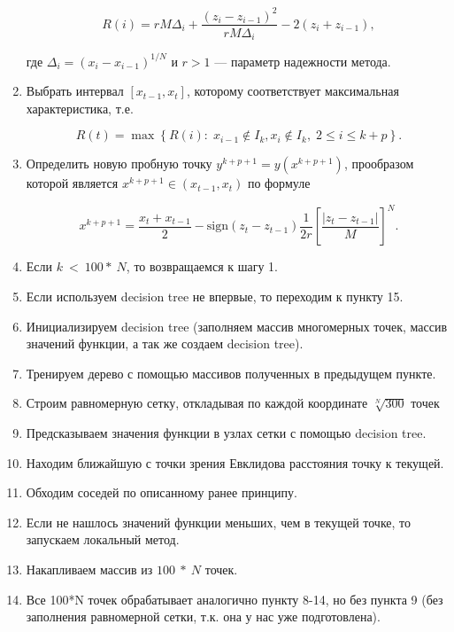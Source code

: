 \documentclass{svproc}
\begin{document}
\begin{enumerate}
\begin{displaymath}
R\left(i\right)=rM\Delta_i+\frac{\left(z_i-z_{i-1}\right)^2}{rM\Delta_i}-2\left(z_i+z_{i-1}\right),
\end{displaymath}

где $\Delta_i=\left(x_i-x_{i-1}\right)^{1/N}$ и $ r>1$ — параметр надежности метода.

\item  Выбрать интервал $\left[x_{t-1},x_t\right]$, которому соответствует максимальная характеристика, т.е.

\begin{displaymath}
R\left(t\right)=\max{\left\{R\left(i\right):\;x_{i-1}\notin I_k,x_i\notin I_k,\;2\le i\le k+p\right\}}.
\end{displaymath}

\item  Определить новую пробную точку $y^{k+p+1}=y\left(x^{k+p+1}\right)$, прообразом которой является $x^{k+p+1}\in\left(x_{t-1},x_t\right)$ по формуле

\begin{displaymath}
x^{k+p+1}=\frac{x_t+x_{t-1}}{2}-\mathrm{sign}\left(z_t-z_{t-1}\right)\frac{1}{2r}\left[\frac{\left|z_t-z_{t-1}\right|}{M}\right]^N.
\end{displaymath}

\item 	Если $ k\ <\ 100\ast\ N$, то возвращаемся к шагу 1.
\item 	Если используем decision tree не впервые, то переходим к пункту 15.
\item 	Инициализируем decision tree (заполняем массив многомерных точек, массив значений функции, а так же создаем decision tree).
\item 	Тренируем дерево с помощью массивов полученных в предыдущем пункте.
\item 	Строим равномерную сетку, откладывая по каждой координате $\sqrt[N]{300}$ точек
\item 	Предсказываем значения функции в узлах сетки с помощью decision tree.
\item 	Находим ближайшую с точки зрения Евклидова расстояния точку к текущей.
\item 	Обходим соседей по описанному ранее принципу.
\item 	Если не нашлось значений функции меньших, чем в текущей точке, то запускаем локальный метод.
\item 	Накапливаем массив из $100\ \ast\ N$ точек.
\item 	Все 100*N точек обрабатывает аналогично пункту 8-14, но без пункта 9 (без заполнения равномерной сетки, т.к. она у нас уже подготовлена).

\end{enumerate}
\end{document}
